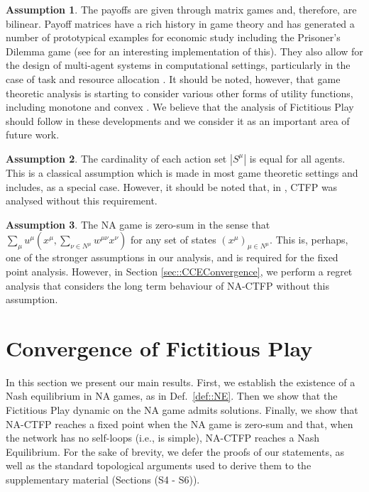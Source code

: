 \documentclass{article}
\theoremstyle{definition}
\newtheorem{assumption}{Assumption}
\newcommand{\actionset}[1]{S^{#1}}
\newcommand{\wmunu}{w^{\mu \nu}}
\newcommand{\xmu}{x^{\mu}}
\newcommand{\xnu}{x^{\nu}}
\newcommand{\weightedsum}{ \sum_{\nu \in N^\mu} \wmunu \xnu}
\begin{document}
  \begin{assumption}\label{ass::matrixgame}
    The payoffs are given through matrix games and, therefore, are bilinear. Payoff matrices
    have a rich history in game theory and has generated a number of prototypical examples for
    economic study including the Prisoner's Dilemma game (see \cite{Axelrod1980} for an interesting
    implementation of this). They also allow for the design of multi-agent systems in
    computational settings, particularly in the case of task and resource allocation \cite{Nisan2007}. It should be noted, however, that game
    theoretic analysis is starting to consider various other forms of utility functions,
    including monotone \cite{Tatarenko2020} and convex \cite{Parise2020}. We believe that the analysis of
    Fictitious Play should follow in these developments and we consider it as an important area
    of future work.
  \end{assumption}

  \begin{assumption}\label{ass::sameactions}
    The cardinality of each action set $|\actionset{\mu}|$ is equal for all agents. This is
    a classical assumption which is made in most game theoretic settings and includes, as a
    special case. However, it should be noted that,
    in \cite{Ewerhart2020}, CTFP was analysed without this requirement.  
  \end{assumption}

  \begin{assumption}\label{ass::zerosum}
    The NA game is zero-sum in the sense that $\sum_{\mu} u^\mu(\xmu, \weightedsum)$ for any set
    of states $(x^\mu)_{\mu \in N^\mu}$. This is, perhaps, one of the stronger assumptions in
    our analysis, and is required for the fixed point analysis. However, in Section
    \ref{sec::CCEConvergence}, we perform a regret analysis that considers the long term
    behaviour of NA-CTFP without this assumption.
  \end{assumption}

\section{Convergence of Fictitious Play}
\label{sec::CTFPAnalysis}

  
  In this section we present our main results. First, we establish the
  existence of a Nash equilibrium in NA games, as in
  Def.~\ref{def::NE}. Then we show that the Fictitious Play
  dynamic on the NA game admits solutions. Finally, we show that NA-CTFP reaches a fixed point when
  the NA game is zero-sum and that, when the network has no self-loops
  (i.e., is simple), NA-CTFP reaches a Nash Equilibrium. For the sake
  of brevity, we defer the proofs of our statements, as well as the
  standard topological arguments used to derive them to the
  supplementary material (Sections (S4 - S6)).
\end{document}
